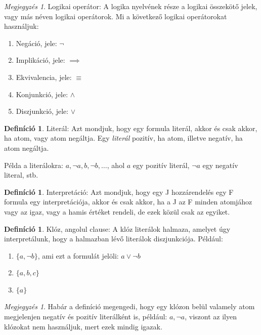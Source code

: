 \documentclass[
]{thesis-ekf}
\theoremstyle{definition}
\newtheorem{definicio}[tetel]{Definíció}
\theoremstyle{remark}
\newtheorem{megjegyzes}[tetel]{Megjegyzés}
\begin{document}
\begin{megjegyzes}
	Logikai operátor: A logika nyelvének része a logikai összekötő jelek, vagy más néven logikai operátorok. Mi a következő logikai operátorokat használjuk:
	\begin{enumerate}
		\item Negáció, jele: $ \neg $
		\item Implikáció, jele: $ \implies $
		\item Ekvivalencia, jele: $ \equiv $
		\item Konjunkció, jele: $ \wedge $
		\item Diszjunkció, jele: $ \vee $
	\end{enumerate}
\end{megjegyzes}

\begin{definicio}
	Literál: Azt mondjuk, hogy egy formula literál, akkor és csak akkor, ha atom, vagy atom negáltja.
	Egy \emph{literál} pozitív, ha atom, illetve negatív, ha atom negáltja. 
\end{definicio}

Példa a literálokra: $ a,\neg a,b,\neg b,\dots $, ahol $a$ egy pozitív literál, $\neg a$ egy negatív literal, stb.

\begin{definicio}
	Interpretáció: Azt mondjuk, hogy egy J hozzárendelés egy F formula egy interpretációja, akkor és csak akkor, ha a J az F minden atomjához vagy az igaz, vagy a hamis értéket rendeli, de ezek közül csak az egyiket.
\end{definicio}

\begin{definicio}
	Klóz, angolul clause: A klóz literálok halmaza, amelyet úgy interpretálunk, hogy a halmazban lévő literálok diszjunkciója. Például:
	\begin{enumerate}
		\item $ \{a,\neg b\} $, ami ezt a formulát jelöli: $a \vee \neg b$
		\item $ \{a,b,c\} $
		\item $ \{a\} $
	\end{enumerate}
\end{definicio}

\begin{megjegyzes}
	Habár a definíció megengedi, hogy egy klózon belül valamely atom
	megjelenjen negatív és pozitív literálként is, például: $ {a,\neg a}$, 
	viszont az ilyen klózokat nem használjuk, mert ezek mindig igazak.
\end{megjegyzes}
\end{document}
